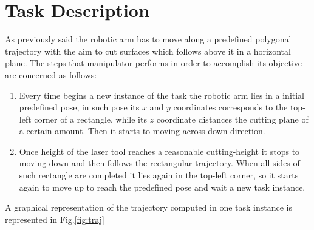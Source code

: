 \section{Task Description}
\label{sec:taskedes}
As previously said the robotic arm has to move along a predefined polygonal trajectory with the aim to cut surfaces which follows above it in a horizontal plane. The steps that manipulator performs in order to accomplish its objective are concerned as follows:

\begin{enumerate}[label=\roman{*}., ref=(\roman{*})]
	\item Every time begins a new instance of the task the robotic arm lies in a initial predefined pose, in such pose its $x$ and $y$ coordinates corresponds to the top-left corner of a rectangle, while its $z$ coordinate distances the cutting plane of a certain amount. Then it starts to moving across down direction.
	\item Once height of the laser tool reaches a reasonable cutting-height it stops to moving down and then follows the rectangular trajectory. When all sides of such rectangle are completed it lies again in the top-left corner, so it starts again to move up to reach the predefined pose and wait a new task instance.
\end{enumerate}

A graphical representation of the trajectory computed in one task instance is represented in Fig.\ref{fig:traj}

